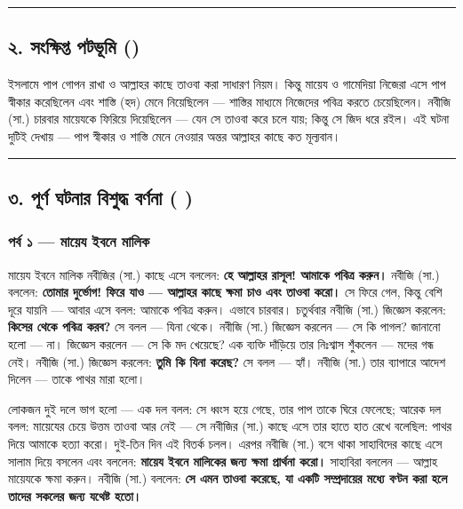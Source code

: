 \medskip\hrule\medskip

\subsection*{২. সংক্ষিপ্ত পটভূমি ()}

ইসলামে পাপ গোপন রাখা ও আল্লাহর কাছে তাওবা করা সাধারণ নিয়ম। কিন্তু মায়েয ও গামেদিয়া নিজেরা এসে পাপ স্বীকার করেছিলেন এবং শাস্তি (হদ) মেনে নিয়েছিলেন — শাস্তির মাধ্যমে নিজেদের পবিত্র করতে চেয়েছিলেন। নবীজি (সা.) চারবার মায়েযকে ফিরিয়ে দিয়েছিলেন — যেন সে তাওবা করে চলে যায়; কিন্তু সে জিদ ধরে রইল। এই ঘটনা দুটিই দেখায় — পাপ স্বীকার ও শাস্তি মেনে নেওয়ার অন্তর আল্লাহর কাছে কত মূল্যবান।

\medskip\hrule\medskip

\subsection*{৩. পূর্ণ ঘটনার বিশুদ্ধ বর্ণনা (  )}

\subsubsection*{পর্ব ১ — মায়েয ইবনে মালিক}

মায়েয ইবনে মালিক নবীজির (সা.) কাছে এসে বললেন: \textbf{হে আল্লাহর রাসূল! আমাকে পবিত্র করুন।} নবীজি (সা.) বললেন: \textbf{তোমার দুর্ভোগ! ফিরে যাও — আল্লাহর কাছে ক্ষমা চাও এবং তাওবা করো।} সে ফিরে গেল, কিন্তু বেশি দূরে যায়নি — আবার এসে বলল: আমাকে পবিত্র করুন। এভাবে চারবার। চতুর্থবার নবীজি (সা.) জিজ্ঞেস করলেন: \textbf{কিসের থেকে পবিত্র করব?} সে বলল — যিনা থেকে। নবীজি (সা.) জিজ্ঞেস করলেন — সে কি পাগল? জানানো হলো — না। জিজ্ঞেস করলেন — সে কি মদ খেয়েছে? এক ব্যক্তি দাঁড়িয়ে তার নিঃশ্বাস শুঁকলেন — মদের গন্ধ নেই। নবীজি (সা.) জিজ্ঞেস করলেন: \textbf{তুমি কি যিনা করেছ?} সে বলল — হ্যাঁ। নবীজি (সা.) তার ব্যাপারে আদেশ দিলেন — তাকে পাথর মারা হলো।

লোকজন দুই দলে ভাগ হলো — এক দল বলল: সে ধ্বংস হয়ে গেছে, তার পাপ তাকে ঘিরে ফেলেছে; আরেক দল বলল: মায়েযের চেয়ে উত্তম তাওবা আর নেই — সে নবীজির (সা.) কাছে এসে তার হাতে হাত রেখে বলেছিল: পাথর দিয়ে আমাকে হত্যা করো। দুই-তিন দিন এই বিতর্ক চলল। এরপর নবীজি (সা.) বসে থাকা সাহাবিদের কাছে এসে সালাম দিয়ে বসলেন এবং বললেন: \textbf{মায়েয ইবনে মালিকের জন্য ক্ষমা প্রার্থনা করো।} সাহাবিরা বললেন — আল্লাহ মায়েযকে ক্ষমা করুন। নবীজি (সা.) বললেন: \textbf{সে এমন তাওবা করেছে, যা একটি সম্প্রদায়ের মধ্যে বণ্টন করা হলে তাদের সকলের জন্য যথেষ্ট হতো।}

